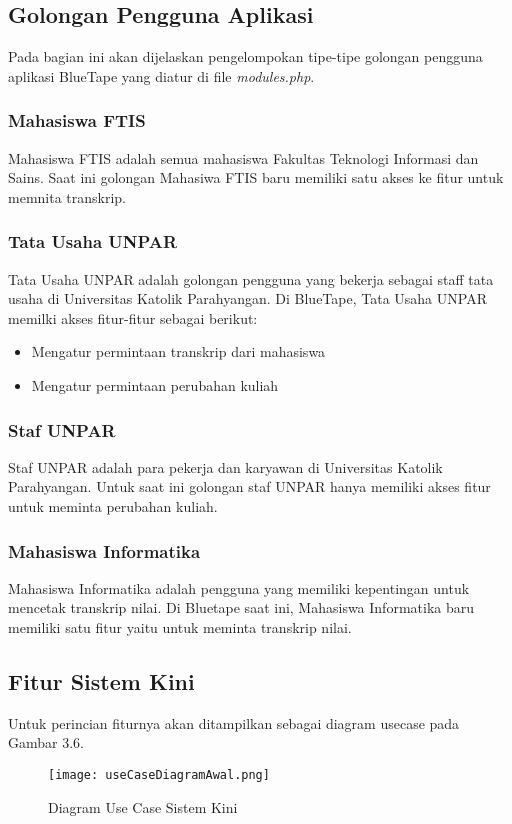 \subsection{Golongan Pengguna Aplikasi}
Pada bagian ini akan dijelaskan pengelompokan tipe-tipe golongan pengguna aplikasi BlueTape yang diatur di file \textit{modules.php}.

\subsubsection{Mahasiswa FTIS}
Mahasiswa FTIS adalah semua mahasiswa Fakultas Teknologi Informasi dan Sains. Saat ini golongan Mahasiwa FTIS baru memiliki satu akses ke fitur untuk memnita transkrip.

\subsubsection{Tata Usaha UNPAR}
Tata Usaha UNPAR adalah golongan pengguna yang bekerja sebagai staff tata usaha di Universitas Katolik Parahyangan. Di BlueTape, Tata Usaha UNPAR memilki akses fitur-fitur sebagai berikut:
\begin{itemize}
	\item Mengatur permintaan transkrip dari mahasiswa
	\item Mengatur permintaan perubahan kuliah 
\end{itemize}

\subsubsection{Staf UNPAR}
Staf UNPAR adalah para pekerja dan karyawan di Universitas Katolik Parahyangan. Untuk saat ini golongan staf UNPAR hanya memiliki akses fitur untuk meminta perubahan kuliah.

\subsubsection{Mahasiswa Informatika}
Mahasiswa Informatika adalah pengguna yang memiliki kepentingan untuk mencetak transkrip nilai. Di Bluetape saat ini, Mahasiswa Informatika baru memiliki satu fitur yaitu untuk meminta transkrip nilai.


\subsection{Fitur Sistem Kini}
Untuk perincian fiturnya akan ditampilkan sebagai diagram usecase pada Gambar 3.6.
\begin{figure} [H]
	\centering  
	\texttt{[image: useCaseDiagramAwal.png]}
	\caption[Diagram Use Case Sistem Kini]{Diagram Use Case Sistem Kini} 
	\label{fig:flow-chart-CodeIgniter} 
\end{figure}

